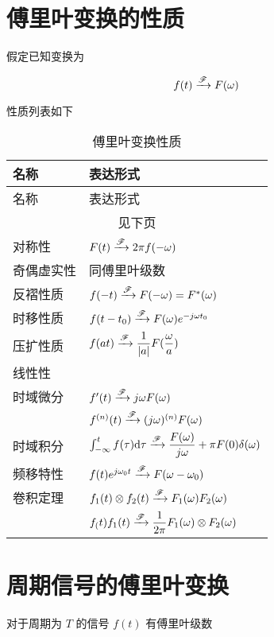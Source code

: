 \documentclass[cn,11pt,chinese,black,simple]{../elegantbook}
\begin{document}
\section{傅里叶变换的性质}

假定已知变换为

\[f(t) \xrightarrow{\mathscr{F}} F(\omega)\]

性质列表如下


\begin{longtable}{ll} 
  \caption{傅里叶变换性质} \\ 
  \toprule
  名称 & 表达形式 \\ 
  \midrule
  \endfirsthead
  
  \toprule
  名称 & 表达形式 \\ 
  \midrule
  \endhead 

  \hline
  \multicolumn{2}{c}{见下页}\\   \bottomrule
  \endfoot

  \bottomrule
  \endlastfoot

  对称性 & \( F(t) \xrightarrow{\mathscr{F}} 2 \pi f(-\omega) \) \\
  奇偶虚实性 & 同傅里叶级数 \\
  反褶性质 & \(f(-t) \xrightarrow{\mathscr{F}} F(-\omega) = F^*(\omega)\) \\
  时移性质 & \(f(t-t_0) \xrightarrow{\mathscr{F}} F(\omega) e^{-j \omega t_0}\) \\
  压扩性质 & \(f(at) \xrightarrow{\mathscr{F}} \dfrac{1}{|a|}F(\dfrac{\omega}{a})\) \\
  线性性 &  \\
  时域微分 & \(f'(t) \xrightarrow{\mathscr{F}} j\omega F(\omega)\) \\
   & \(f^{(n)}(t) \xrightarrow{\mathscr{F}} (j\omega)^{(n)} F(\omega)\) \\
  时域积分 & \(\int_{-\infty}^{t}f(\tau) \mathrm{d}\tau \xrightarrow{\mathscr{F}} \dfrac{F(\omega)}{j\omega} + \pi F(0) \delta(\omega)\) \\
  频移特性 & \(f(t)e^{j \omega_0 t} \xrightarrow{\mathscr{F}} F(\omega - \omega_0)\) \\
  卷积定理 & \(f_1(t) \otimes f_2(t) \xrightarrow{\mathscr{F}} F_1(\omega)F_2(\omega)\)\\
  & \(f_(t)f_1(t) \xrightarrow{\mathscr{F}} \dfrac{1}{2\pi} F_1(\omega)\otimes F_2(\omega)\)
  
  
\end{longtable}

\section{周期信号的傅里叶变换}

对于周期为 \(T\) 的信号 \(f(t)\) 有傅里叶级数
\end{document}
